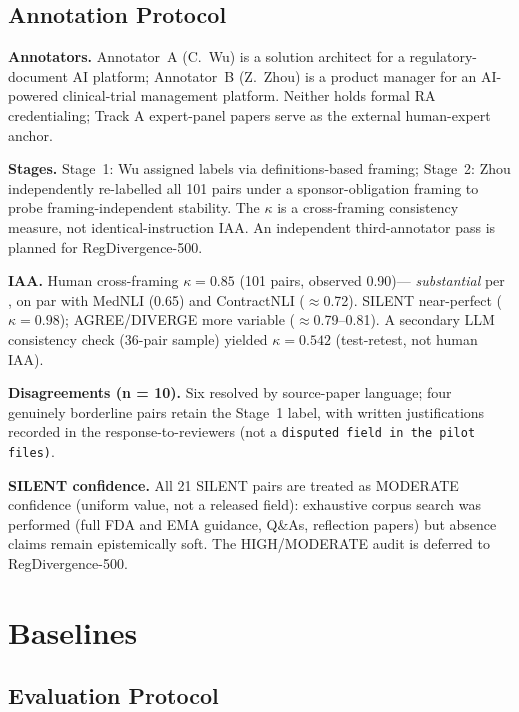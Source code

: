 \documentclass[manuscript]{acmart}
\begin{document}
\subsection{Annotation Protocol}
\label{sec:annotation}

\textbf{Annotators.} Annotator~A (C.~Wu) is a solution architect for a
regulatory-document AI platform; Annotator~B (Z.~Zhou) is a product manager for
an AI-powered clinical-trial management platform. Neither holds formal RA
credentialing; Track A expert-panel papers serve as the external human-expert
anchor.

\textbf{Stages.} Stage~1: Wu assigned labels via definitions-based framing;
Stage~2: Zhou independently re-labelled all 101 pairs under a sponsor-obligation
framing to probe framing-independent stability. The $\kappa$ is a cross-framing
consistency measure, not identical-instruction IAA. An independent
third-annotator pass is planned for RegDivergence-500.

\textbf{IAA.} Human cross-framing $\kappa = 0.85$ (101 pairs, observed 0.90)---%
\textit{substantial} per \citet{landis1977kappa}, on par with MedNLI (0.65)
and ContractNLI ($\approx$0.72). SILENT near-perfect ($\kappa = 0.98$);
AGREE/DIVERGE more variable ($\approx$0.79--0.81). A secondary LLM
consistency check (36-pair sample) yielded $\kappa = 0.542$ (test-retest,
not human IAA).

\textbf{Disagreements (n = 10).} Six resolved by source-paper language; four
genuinely borderline pairs retain the Stage~1 label, with written justifications
recorded in the response-to-reviewers (not a \texttt{disputed field in the pilot files)}.

\textbf{SILENT confidence.} All 21 SILENT pairs are treated as MODERATE
confidence (uniform value, not a released field): exhaustive corpus search was performed
(full FDA and EMA guidance, Q\&As, reflection papers) but absence claims remain
epistemically soft. The HIGH/MODERATE audit is deferred to RegDivergence-500.

\section{Baselines}

\subsection{Evaluation Protocol}
\label{sec:eval_context}
\end{document}
